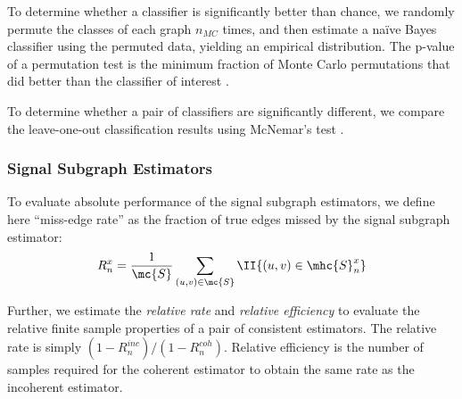 \documentclass[10pt,journal,cspaper,compsoc]{IEEEtran}
\begin{document}
To determine whether a classifier is significantly better than chance, we randomly permute the classes of each graph $n_{MC}$ times, and then estimate a na\"ive Bayes classifier using the permuted data, yielding an empirical distribution.  The p-value of a permutation test is the minimum fraction of Monte Carlo permutations that did better than the classifier of interest \cite{Good2010}.  

To determine whether a pair of classifiers are significantly different, we compare the leave-one-out classification results using McNemar's test \cite{McNemar1947}.


\subsubsection{Signal Subgraph Estimators} %
\label{ssub:signal_subgraph_estimators}


To evaluate absolute performance of the signal subgraph estimators, we define here ``miss-edge rate'' as the fraction of true edges missed by the signal subgraph estimator:
\begin{align}
R^x_n = \frac{1}{\mc{S}} \sum_{(u,v)\in \mc{S}}\II\{(u,v) \in \mhc{S}^x_n\}
\end{align}

Further, we estimate the \emph{relative rate} and \emph{relative efficiency} to evaluate the relative finite sample properties of a pair of consistent estimators. The relative rate is simply $(1-R^{inc}_n)/(1-R^{coh}_n)$.  Relative efficiency is the number of samples required for the coherent estimator to obtain the same rate as the incoherent estimator.


% 
\end{document}
